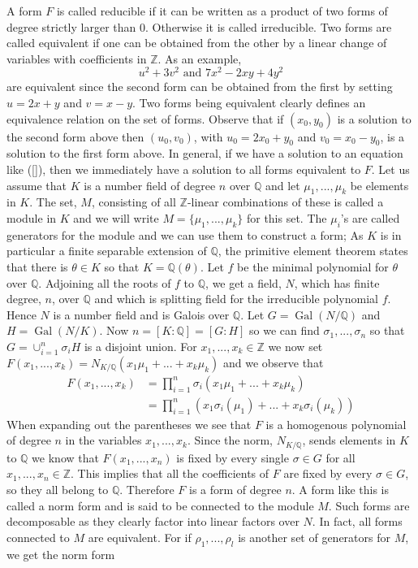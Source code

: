 \documentclass{article}
\DeclareMathOperator{\Gal}{Gal}
\newcommand{\mbb}[1]{\mathbb{#1}}
\begin{document}
A form $F$ is called reducible if it can be written as a product of two forms of degree strictly larger than 0. Otherwise it is called irreducible. Two forms are called equivalent if one can be obtained from the other by a linear change of variables with coefficients in $\mbb{Z}$. As an example,
\begin{equation*}
    u^2 + 3v^2 \text{ and } 7x^2 - 2xy + 4y^2
\end{equation*}
are equivalent since the second form can be obtained from the first by setting $u = 2x+y$ and $v = x-y$.  Two forms being equivalent clearly defines an equivalence relation on the set of forms. Observe that if $(x_0, y_0)$ is a solution to the second form above then $(u_0, v_0)$, with $u_0 = 2x_0 + y_0$ and $v_0 = x_0 - y_0$, is a solution to the first form above. In general, if we have a solution to an equation like (\ref{}), then we immediately have a solution to all forms equivalent to $F$. Let us assume that $K$ is a number field of degree $n$ over $\mbb Q$ and let $\mu_1, ..., \mu_k$ be elements in $K$. The set, $M$, consisting of all $\mbb{Z}$-linear combinations of these is called a module in $K$ and we will write $M = \{\mu_1, ..., \mu_k\}$ for this set. The $\mu_i$'s are called generators for the module and we can use them to construct a form; As $K$ is in particular a finite separable extension of $\mbb Q$, the primitive element theorem states that there is $\theta \in K$ so that $K = \mbb Q(\theta)$. Let $f$ be the minimal polynomial for $\theta$ over $\mbb Q$. Adjoining all the roots of $f$ to $\mbb Q$, we get a field, $N$, which has finite degree, $n$, over $\mbb Q$ and which is splitting field for the irreducible polynomial $f$. Hence $N$ is a number field and is Galois over $\mbb Q$. Let $G = \Gal(N / \mbb Q)$ and $H = \Gal(N / K)$. Now $n = [K : \mbb Q] = [G : H]$ so we can find $\sigma_1, ..., \sigma_n$ so that
$G = \cup_{i=1}^n \sigma_i H$
is a disjoint union. For $x_1, ..., x_k \in \mbb Z$ we now set $F(x_1, ..., x_k) = N_{K/\mbb Q}(x_1 \mu_1 + ... + x_k \mu_k)$ and we observe that 
\begin{align*}
    F(x_1, ..., x_k) &= \prod_{i = 1}^n \sigma_i(x_1 \mu_1 + ... + x_k \mu_k)\\ 
    &= \prod_{i = 1}^n \left(x_1 \sigma_i(\mu_1) + ... + x_k \sigma_i(\mu_k) \right)
\end{align*}
When expanding out the parentheses we see that $F$ is a homogenous polynomial of degree $n$ in the variables $x_1, ..., x_k$. Since the norm, $N_{K/\mbb Q}$, sends elements in $K$ to $\mbb Q$ we know that $F(x_1, ..., x_n)$ is fixed by every single $\sigma \in G$ for all $x_1, ..., x_n \in \mbb Z$. This implies that all the coefficients of $F$ are fixed by every $\sigma \in G$, so they all belong to $\mbb Q$. Therefore $F$ is a form of degree $n$. A form like this is called a norm form and is said to be connected to the module $M$. Such forms are decomposable as they clearly factor into linear factors over $N$. In fact, all forms connected to $M$ are equivalent. For if $\rho_1, ...,\rho_l$ is another set of generators for $M$, we get the norm form
\end{document}
